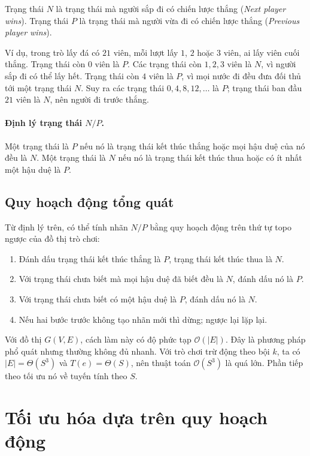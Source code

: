 \documentclass[11pt]{article}
\newcommand{\Oh}{\mathcal{O}}
\begin{document}
Trạng thái \(N\) là trạng thái mà người sắp đi có chiến lược thắng
(\emph{Next player wins}). Trạng thái \(P\) là trạng thái mà người vừa đi có
chiến lược thắng (\emph{Previous player wins}).

Ví dụ, trong trò lấy đá có \(21\) viên, mỗi lượt lấy \(1\), \(2\) hoặc \(3\)
viên, ai lấy viên cuối thắng. Trạng thái còn \(0\) viên là \(P\). Các trạng
thái còn \(1,2,3\) viên là \(N\), vì người sắp đi có thể lấy hết. Trạng thái
còn \(4\) viên là \(P\), vì mọi nước đi đều đưa đối thủ tới một trạng thái
\(N\). Suy ra các trạng thái \(0,4,8,12,\ldots\) là \(P\); trạng thái ban đầu
\(21\) viên là \(N\), nên người đi trước thắng.

\paragraph{Định lý trạng thái \(N/P\).}
Một trạng thái là \(P\) nếu nó là trạng thái kết thúc thắng hoặc mọi hậu duệ
của nó đều là \(N\). Một trạng thái là \(N\) nếu nó là trạng thái kết thúc
thua hoặc có ít nhất một hậu duệ là \(P\).

\subsection{Quy hoạch động tổng quát}

Từ định lý trên, có thể tính nhãn \(N/P\) bằng quy hoạch động trên thứ tự topo
ngược của đồ thị trò chơi:
\begin{enumerate}
  \item Đánh dấu trạng thái kết thúc thắng là \(P\), trạng thái kết thúc thua
  là \(N\).
  \item Với trạng thái chưa biết mà mọi hậu duệ đã biết đều là \(N\), đánh
  dấu nó là \(P\).
  \item Với trạng thái chưa biết có một hậu duệ là \(P\), đánh dấu nó là \(N\).
  \item Nếu hai bước trước không tạo nhãn mới thì dừng; ngược lại lặp lại.
\end{enumerate}

Với đồ thị \(G(V,E)\), cách làm này có độ phức tạp \(\Oh(|E|)\). Đây là
phương pháp phổ quát nhưng thường không đủ nhanh. Với trò chơi trừ động theo
bội \(k\), ta có \(|E|=\Theta(S^3)\) và \(T(e)=\Theta(S)\), nên thuật toán
\(\Oh(S^3)\) là quá lớn. Phần tiếp theo tối ưu nó về tuyến tính theo \(S\).

\section{Tối ưu hóa dựa trên quy hoạch động}
\end{document}
